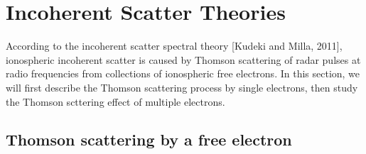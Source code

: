 \section{Incoherent Scatter Theories}
According to the incoherent scatter spectral theory [Kudeki and Milla, 2011], ionospheric incoherent scatter is caused by Thomson scattering of radar pulses at radio frequencies from collections of ionospheric free electrons. In this section, we will first describe the Thomson scattering process by single electrons, then study the Thomson scttering effect of multiple electrons.
\subsection{Thomson scattering by a free electron}